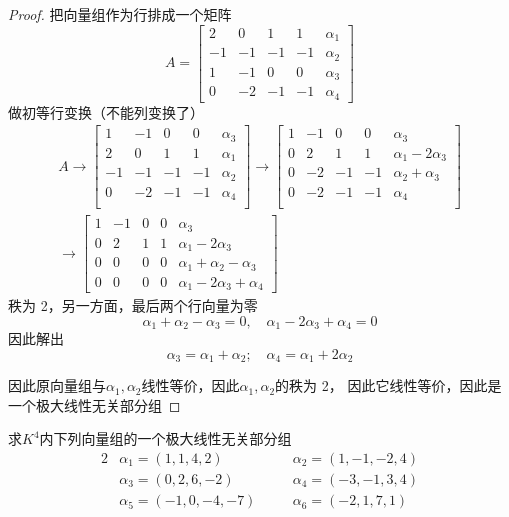 \documentclass[11pt]{article}
\begin{document}
\begin{proof}
把向量组作为行排成一个矩阵
\begin{equation*}
A=
\begin{bmatrix}
2&0&1&1&\alpha_1\\
-1&-1&-1&-1&\alpha_2\\
1&-1&0&0&\alpha_3\\
0&-2&-1&-1&\alpha_4
\end{bmatrix}
\end{equation*}
做初等行变换（不能列变换了）
\begin{gather*}
A\to
\begin{bmatrix}
1&-1&0&0&\alpha_3\\
2&0&1&1&\alpha_1\\
-1&-1&-1&-1&\alpha_2\\
0&-2&-1&-1&\alpha_4\\
\end{bmatrix}\to
\begin{bmatrix}
1&-1&0&0&\alpha_3\\
0&2&1&1&\alpha_1-2\alpha_3\\
0&-2&-1&-1&\alpha_2+\alpha_3\\
0&-2&-1&-1&\alpha_4\\
\end{bmatrix}\\
\to
\begin{bmatrix}
1&-1&0&0&\alpha_3\\
0&2&1&1&\alpha_1-2\alpha_3\\
0&0&0&0&\alpha_1+\alpha_2-\alpha_3\\
0&0&0&0&\alpha_1-2\alpha_3+\alpha_4
\end{bmatrix}
\end{gather*}
秩为 2，另一方面，最后两个行向量为零
\begin{equation*}
\alpha_1+\alpha_2-\alpha_3=0,\quad
\alpha_1-2\alpha_3+\alpha_4=0
\end{equation*}
因此解出
\begin{equation*}
\alpha_3=\alpha_1+\alpha_2;\quad\alpha_4=\alpha_1+2\alpha_2
\end{equation*}

因此原向量组与\(\alpha_1,\alpha_2\)线性等价，因此\(\alpha_1,\alpha_2\)的秩为 2，
因此它线性等价，因此是一个极大线性无关部分组
\end{proof}

\begin{proposition}[]
求\(K^4\)内下列向量组的一个极大线性无关部分组
\begin{alignat*}{2}
&\alpha_1=(1,1,4,2)&&\alpha_2=(1,-1,-2,4)\\
&\alpha_3=(0,2,6,-2)&&\alpha_4=(-3,-1,3,4)\\
&\alpha_5=(-1,0,-4,-7)\quad&&\alpha_6=(-2,1,7,1)
\end{alignat*}
\end{proposition}
\end{document}
